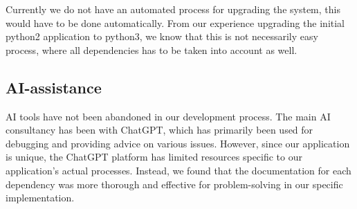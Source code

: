 Currently we do not have an automated process for upgrading the system, this would have to be done automatically. From our experience upgrading the initial python2 application to python3, we know that this is not necessarily easy process, where all dependencies has to be taken into account as well. 


\subsection{AI-assistance}
AI tools have not been abandoned in our development process. The main AI consultancy has been with ChatGPT, which has primarily been used for debugging and providing advice on various issues. However, since our application is unique, the ChatGPT platform has limited resources specific to our application's actual processes. Instead, we found that the documentation for each dependency was more thorough and effective for problem-solving in our specific implementation.
